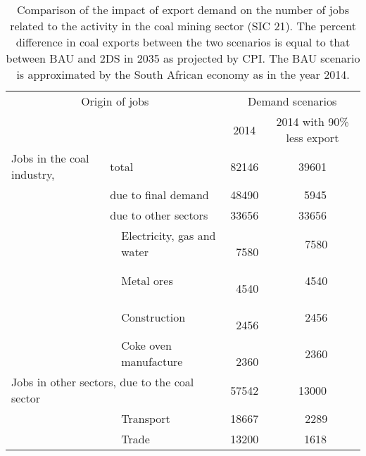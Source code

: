 \documentclass[12pt,english]{article}
\begin{document}
\begin{table}[ht]
	\centering
	\begin{tabular}{lp{20pt}lcc}
		\multicolumn{3}{c}{Origin of jobs} &\multicolumn{2}{c}{Demand scenarios}   \\ 
		\multicolumn{3}{c}{} & 2014 & 2014 with 90\% less export \\ 
		\midrule
		Jobs in the coal industry,	& \multicolumn{2}{l}{total}  & 82146 & 39601 \\ 
		& \multicolumn{2}{l}{due to final demand}  & 48490 & \, 5945 \\ 
		
		& \multicolumn{2}{l}{due to other sectors}  & 33656 & 33656 \\ 
		& 	 & Electricity, gas and water & \,\ 7580  & \,\ 7580 \\ 
		&    & Metal ores& \,\ 4540  & \,\ 4540 \\ 
		&    & Construction& \,\ 2456  & \,\ 2456  \\ 														
		&    & Coke oven manufacture& \,\ 2360  & \,\ 2360   \\ 
		\midrule
		\multicolumn{3}{l}{Jobs in other sectors, due to the coal sector}  & 57542 &  13000 \\ 
		& 						 & Transport & 18667 &  \ \,2289 \\ 
		& 						 & Trade & 13200 &  \  1618 \\ 
		\bottomrule
	\end{tabular}
	\caption{\label{coalExport_BAUvs2DS_2035}Comparison of the impact of export demand on the number of jobs related to the activity in the coal mining sector (SIC 21). The percent difference in coal exports between the two scenarios is equal to that between BAU and 2DS in 2035 as projected by CPI. The BAU scenario is approximated by the South African economy as in the year 2014.}
\end{table}
\end{document}
